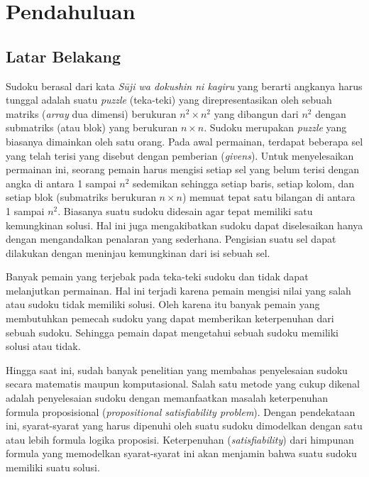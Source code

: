 \chapter{Pendahuluan}

\section{Latar Belakang}

Sudoku berasal dari kata \textit{Sūji wa dokushin ni kagiru} yang berarti angkanya harus tunggal\cite{SATPy3} adalah suatu \textit{puzzle} (teka-teki) yang direpresentasikan oleh sebuah matriks (\textit{array}
dua dimensi) berukuran ${n^2 \times n^2}$  yang dibangun dari ${n^2}$ dengan submatriks (atau blok)
yang berukuran ${n \times n}$. Sudoku merupakan \textit{puzzle}
yang biasanya dimainkan oleh satu orang.  Pada
awal permainan, terdapat beberapa sel yang telah terisi yang disebut dengan pemberian
(\textit{givens}). Untuk menyelesaikan permainan ini, seorang pemain harus mengisi setiap sel yang
belum terisi dengan angka di antara 1 sampai
$n^2$ sedemikan sehingga setiap baris, setiap kolom,
dan setiap blok (submatriks berukuran $n \times n$) memuat tepat satu bilangan di antara 1 sampai $n^2$. Biasanya suatu sudoku didesain agar tepat memiliki satu kemungkinan solusi. Hal
ini juga mengakibatkan sudoku dapat diselesaikan hanya dengan mengandalkan penalaran
yang sederhana. Pengisian suatu sel dapat dilakukan dengan meninjau kemungkinan dari
isi sebuah sel.

Banyak pemain yang terjebak pada teka-teki sudoku dan tidak dapat melanjutkan permainan. Hal ini terjadi karena pemain mengisi nilai yang salah atau sudoku tidak memiliki solusi. Oleh karena itu banyak pemain yang membutuhkan pemecah sudoku yang dapat memberikan keterpenuhan dari sebuah sudoku. Sehingga pemain dapat mengetahui sebuah sudoku memiliki solusi atau tidak.

Hingga saat ini, sudah banyak penelitian yang membahas penyelesaian sudoku secara
matematis maupun komputasional. Salah satu metode yang cukup dikenal adalah penyelesaian
sudoku dengan memanfaatkan masalah keterpenuhan formula proposisional (\textit{propositional satisfiability problem}). Dengan pendekataan ini, syarat-syarat yang
harus dipenuhi oleh suatu sudoku dimodelkan dengan satu atau lebih formula logika proposisi\cite{KJ06,LO06}.
Keterpenuhan (\textit{satisfiability}) dari himpunan formula yang memodelkan syarat-syarat
ini akan menjamin bahwa suatu sudoku memiliki suatu solusi.

